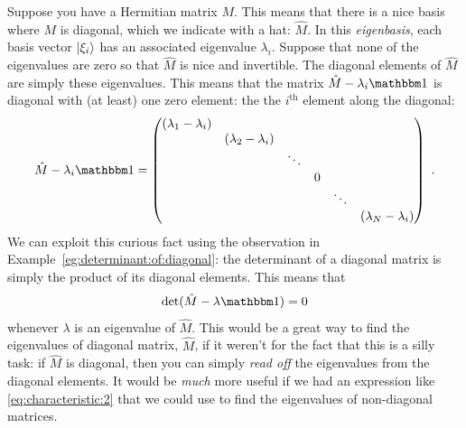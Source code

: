 \documentclass[12pt, oneside]{report}    %
\begin{document}
Suppose you have a Hermitian matrix $M$. This means that there is a nice basis where $M$ is diagonal, which we indicate with a hat: $\hat M$. In this \emph{eigenbasis}, each basis vector $\left|\xi_i\right\rangle$ has an associated eigenvalue $\lambda_i$. Suppose that none of the eigenvalues are zero so that $\hat M$ is nice and invertible. The diagonal elements of $\hat M$ are simply these eigenvalues. This means that the matrix $\hat M - \lambda_i \one$ is diagonal with (at least) one zero element: the the $i^\text{th}$ element along the diagonal:
\begin{align}
\hat M -\lambda_i\one = 
    \begin{pmatrix}
        (\lambda_1 - \lambda_i) & & & && \\
         & (\lambda_2 - \lambda_i) & & && \\
         & & \ddots &&& \\
         & & & 0 & & \\
         & & && \ddots & \\
         & & &&& (\lambda_N-\lambda_i)
    \end{pmatrix} \ .
    \label{eq:characteristic:1}
\end{align} 
We can exploit this curious fact using the observation in Example~\ref{eg:determinant:of:diagonal}: the determinant of a diagonal matrix is simply the product of its diagonal elements. This means that
\begin{align}
     \det(\hat M - \lambda \one) = 0
     \label{eq:characteristic:2}
\end{align}
whenever $\lambda$ is an eigenvalue of $\hat M$. This would be a great way to find the eigenvalues of diagonal matrix, $\hat M$, if it weren't for the fact that this is a silly task: if $\hat M$ is diagonal, then you can simply \emph{read off} the eigenvalues from the diagonal elements. It would be \emph{much} more useful if we had an expression like \eqref{eq:characteristic:2} that we could use to find the eigenvalues of non-diagonal matrices.  
\end{document}
